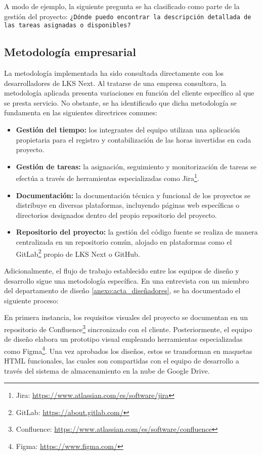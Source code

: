 A modo de ejemplo, la siguiente pregunta se ha clasificado como parte de la gestión del proyecto: \texttt{¿Dónde puedo encontrar la descripción detallada de las tareas asignadas o disponibles?}

\subsection{Metodología empresarial}
La metodología implementada ha sido consultada directamente con los desarrolladores de LKS Next. Al tratarse de una empresa consultora, la metodología aplicada presenta variaciones en función del cliente específico al que se presta servicio. No obstante, se ha identificado que dicha metodología se fundamenta en las siguientes directrices comunes:
\begin{itemize}
\item\textbf{Gestión del tiempo: }los integrantes del equipo utilizan una aplicación propietaria para el registro y contabilización de las horas invertidas en cada proyecto.
\item\textbf{Gestión de tareas: }la asignación, seguimiento y monitorización de tareas se efectúa a través de herramientas especializadas como Jira\footnote{Jira: \url{https://www.atlassian.com/es/software/jira}}.
\item\textbf{Documentación: }la documentación técnica y funcional de los proyectos se distribuye en diversas plataformas, incluyendo páginas web específicas o directorios designados dentro del propio repositorio del proyecto.
\item\textbf{Repositorio del proyecto: }la gestión del código fuente se realiza de manera centralizada en un repositorio común, alojado en plataformas como el GitLab\footnote{GitLab: \url{https://about.gitlab.com/}} propio de LKS Next o GitHub.

\end{itemize}
Adicionalmente, el flujo de trabajo establecido entre los equipos de diseño y desarrollo sigue una metodología específica. En una entrevista con un miembro del departamento de diseño \ref{anexo:acta_diseñadores}, se ha documentado el siguiente proceso:

En primera instancia, los requisitos visuales del proyecto se documentan en un repositorio de Confluence\footnote{Confluence: \url{https://www.atlassian.com/es/software/confluence}} sincronizado con el cliente. Posteriormente, el equipo de diseño elabora un prototipo visual empleando herramientas especializadas como Figma\footnote{Figma: \url{https://www.figma.com/}}. Una vez aprobados los diseños, estos se transforman en maquetas HTML funcionales, las cuales son compartidas con el equipo de desarrollo a través del sistema de almacenamiento en la nube de Google Drive.


